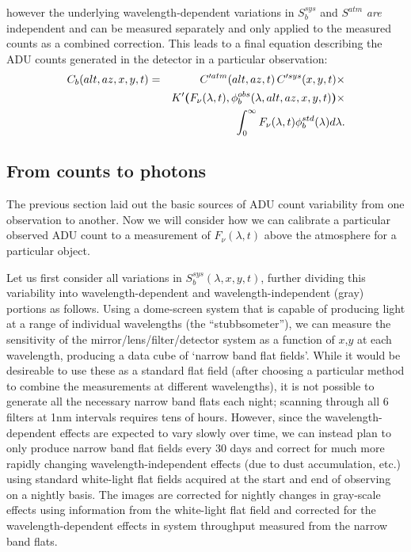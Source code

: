 \documentclass[12pt,preprint]{aastex}
\begin{document}
however the underlying wavelength-dependent variations in $S_b^{sys}$
and $S^{atm}$ {\it are} independent and can be measured separately and
only applied to the measured counts as a combined correction. This
leads to a final equation describing the ADU counts generated in the
detector in a particular observation:
\begin{eqnarray}
\label{eqn:counts}
C_b(alt,az,x,y,t) &  = & C'^{atm}(alt,az,t) \, C'^{sys}(x,y,t) \times \nonumber \\
 & & K'{\textbf(}F_\nu(\lambda,t), 
\phi_b^{obs}(\lambda,alt,az,x,y,t){\textbf)} \times \nonumber \\
& & \int_0^\infty {F_\nu(\lambda,t)\phi_b^{std}(\lambda)  d\lambda}.
\end{eqnarray}

\subsection{From counts to photons}

The previous section laid out the basic sources of ADU count
variability from one observation to another. Now we will consider how
we can calibrate a particular observed ADU count to a
measurement of $F_\nu(\lambda,t)$ above the atmosphere for a particular object.

Let us first consider all variations in $S_b^{sys}(\lambda,x,y,t)$,
further dividing this variability into wavelength-dependent and
wavelength-independent (gray) portions as follows. Using a dome-screen
system that is capable of producing light at a range of individual
wavelengths (the ``stubbsometer''), we can measure the sensitivity of
the mirror/lens/filter/detector system as a function of $x$,$y$ at
each wavelength, producing a data cube of `narrow band flat
fields'. While it would be desireable to use these as a standard flat
field (after choosing a particular method to combine the measurements
at different wavelengths), it is not possible to generate all the
necessary narrow band flats each night; scanning through all 6 filters
at 1nm intervals requires tens of hours. However, since the
wavelength-dependent effects are expected to vary slowly over time, we
can instead plan to only produce narrow band flat fields every 30 days
and correct for much more rapidly changing wavelength-independent
effects (due to dust accumulation, etc.) using standard white-light
flat fields acquired at the start and end of observing on a nightly
basis.  The images are corrected for nightly changes in gray-scale
effects using information from the white-light flat field and
corrected for the wavelength-dependent effects in system throughput
measured from the narrow band flats.
\end{document}
